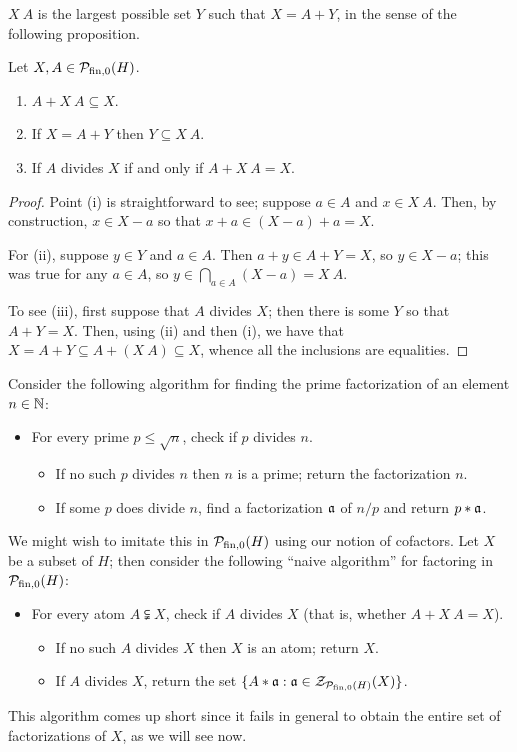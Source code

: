 $X\:A$ is the largest possible set $Y$ such that $X = A + Y$, in the sense of the following proposition.

\begin{prop} \label{prop:cofactors}
	Let $X,A \in \P_\fon(H)$. 
	\begin{enumerate}[label={\rm (\roman{*})}]
		\item $A + X\:A \subseteq X$.
		\item If $X = A + Y$ then $Y \subseteq X\:A$.
		\item If $A$ divides $X$ if and only if $A + X\:A = X$.
	\end{enumerate}
\end{prop}

\begin{proof}
	Point (i) is straightforward to see; suppose $a\in A$ and $x\in X\:A$.
	Then, by construction, $x\in X-a$ so that $x+a \in (X-a) +a = X$.
	
	For (ii), suppose $y\in Y$ and $a\in A$.
	Then $a+y \in A + Y = X$, so $y \in X-a$; this was true for any $a\in A$, so $y\in \bigcap_{a\in A} (X-a) = X\:A$.
	
	To see (iii), first suppose that $A$ divides $X$; then there is some $Y$ so that $A + Y = X$.
	Then, using (ii) and then (i), we have that $X = A+Y \subseteq A+ (X\:A) \subseteq X$, whence all the inclusions are equalities.
\end{proof}


\begin{rk}
Consider the following algorithm for finding the prime factorization of an element $n\in \NN$:
\begin{itemize}
	\item For every prime $p \le \sqrt{n}$, check if $p$ divides $n$.
	\begin{itemize}
		\item If no such $p$ divides $n$ then $n$ is a prime; return the factorization $n$.
		\item If some $p$ does divide $n$, find a factorization $\aa$ of $n/p$ and return $p * \aa$.
	\end{itemize}
\end{itemize}
	
We might wish to imitate this in $\P_\fon(H)$ using our notion of cofactors.
Let $X$ be a subset of $H$; then consider the following ``naive algorithm'' for factoring in $\P_\fon(H)$:
\begin{itemize}
	\item For every atom $A \subsetneqq X$, check if $A$ divides $X$ (that is, whether $A + X\:A = X$).
	\begin{itemize}
		\item If no such $A$ divides $X$ then $X$ is an atom; return $X$.
		\item If $A$ divides $X$, return the set $\{A * \aa: \aa\in \Z_{\P_\fon(H)}(X) \}$.
	\end{itemize}
\end{itemize}
This algorithm comes up short since it fails in general to obtain the entire set of factorizations of $X$, as we will see now.
\end{rk}

